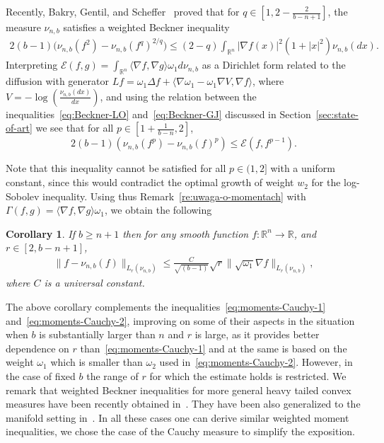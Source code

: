 \documentclass[a4paper]{amsart}
\newtheorem{corollary}[theorem]{Corollary} %
\theoremstyle{definition}
\theoremstyle{remark}
\numberwithin{equation}{section}
\newcommand*{\RR}{\mathbb{R}}
\newcommand*{\calE}{\mathcal{E}}
\begin{document}
Recently, Bakry, Gentil, and Scheffer~\cite{MR4048609} proved that for $q \in [1,2- \frac{2}{b-n+1}]$, the measure $\nu_{n,b}$ satisfies a weighted Beckner inequality
\begin{align}\label{eq:weighted-Beckner}
2(b-1)\Big(\nu_{n,b}(f^2) - \nu_{n,b}(f^q)^{2/q}\Big) \le (2-q)\int_{\RR^n} |\nabla f(x)|^2(1+|x|^2) \nu_{n,b}(dx).
\end{align}
Interpreting $\calE(f,g) = \int_{\RR^n} \langle \nabla f,\nabla g\rangle \omega_1d\nu_{n,b}$ as a Dirichlet form related to the diffusion with generator $L f = \omega_1 \Delta f +\langle \nabla \omega_1 - \omega_1\nabla V,\nabla f\rangle$, where $V = - \log(\frac{\nu_{n,b}(dx)}{dx})$, and using the relation between the inequalities~\eqref{eq:Beckner-LO} and~\eqref{eq:Beckner-GJ} discussed in Section~\ref{sec:state-of-art} we see that for all $p \in [1+\frac{1}{b-n},2]$,
\begin{displaymath}
  2(b-1)(\nu_{n,b}(f^p) - \nu_{n,b}(f)^p) \le \calE(f,f^{p-1}).
\end{displaymath}

Note that this inequality cannot be satisfied for all $p \in (1,2]$ with a uniform constant, since this would contradict the optimal growth of weight $w_2$ for the log-Sobolev inequality. Using thus Remark~\ref{re:uwaga-o-momentach} with $\Gamma(f,g) = \langle \nabla f,\nabla g\rangle \omega_1$, we obtain the following
\begin{corollary}
 If $b \ge n+1$ then for any smooth function $f\colon \RR^n\to \RR$, and $r \in [2,b-n+1]$,
\begin{align}\label{eq:moments-Cauchy-3}
\|f - \nu_{n,b}(f)\|_{L_r(\nu_{n,b})} \le \frac{C}{\sqrt{(b-1)}}\sqrt{r}\|\sqrt{\omega_1} \nabla f\|_{L_r(\nu_{n,b})},
\end{align}
where $C$ is a universal constant.
\end{corollary}

The above corollary complements the inequalities~\eqref{eq:moments-Cauchy-1} and~\eqref{eq:moments-Cauchy-2}, improving on some of their aspects in the situation when $b$ is substantially larger than $n$ and $r$ is large, as it provides  better dependence on $r$ than~\eqref{eq:moments-Cauchy-1} and at the same is based on the weight $\omega_1$ which is smaller than $\omega_2$ used in~\eqref{eq:moments-Cauchy-2}. 
However, in the case of fixed $b$ the range of $r$ for which the estimate holds is restricted.  We remark that weighted Beckner inequalities for more general heavy tailed convex measures have been recently obtained in~\cite{MR4003575}. They have been also generalized to the manifold setting in~\cite{gentil2019family}. In all these cases one can derive similar weighted moment inequalities, we chose the case of the Cauchy measure to simplify the exposition.
\end{document}
